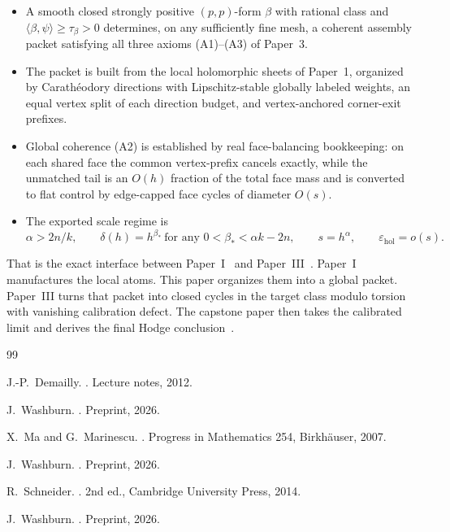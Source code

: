 \documentclass[11pt]{article}
\numberwithin{equation}{section}
\theoremstyle{plain}
\theoremstyle{definition}
\theoremstyle{remark}
\newcommand{\eps}{\varepsilon}
\begin{document}
\begin{itemize}
\item A smooth closed strongly positive $(p,p)$-form $\beta$ with rational class and $\langle\beta,\psi\rangle\ge \tau_\beta>0$ determines, on any sufficiently fine mesh, a coherent assembly packet satisfying all three axioms (A1)--(A3) of Paper~3.
\item The packet is built from the local holomorphic sheets of Paper~1, organized by Carath\'eodory directions with Lipschitz-stable globally labeled weights, an equal vertex split of each direction budget, and vertex-anchored corner-exit prefixes.
\item Global coherence (A2) is established by real face-balancing bookkeeping: on each shared face the common vertex-prefix cancels exactly, while the unmatched tail is an $O(h)$ fraction of the total face mass and is converted to flat control by edge-capped face cycles of diameter $O(s)$.
\item The exported scale regime is
\[
\alpha>2n/k,
\qquad
\delta(h)=h^{\beta_\ast}\ \text{for any }0<\beta_\ast<\alpha k-2n,
\qquad
s=h^\alpha,
\qquad
\eps_{\mathrm{hol}}=o(s).
\]
\end{itemize}

That is the exact interface between Paper~I~\cite{Washburn26I} and Paper~III~\cite{Washburn26III}.  Paper~I manufactures the local atoms.  This paper organizes them into a global packet.  Paper~III turns that packet into closed cycles in the target class modulo torsion with vanishing calibration defect.  The capstone paper then takes the calibrated limit and derives the final Hodge conclusion~\cite{Washburn26IV}.

\begin{thebibliography}{99}

J.-P.~Demailly.
.
\newblock Lecture notes, 2012.

J.~Washburn.
.
\newblock Preprint, 2026.

X.~Ma and G.~Marinescu.
.
\newblock Progress in Mathematics 254, Birkh\"auser, 2007.

J.~Washburn.
.
\newblock Preprint, 2026.

R.~Schneider.
.
\newblock 2nd ed., Cambridge University Press, 2014.

J.~Washburn.
.
\newblock Preprint, 2026.

\end{thebibliography}
\end{document}
